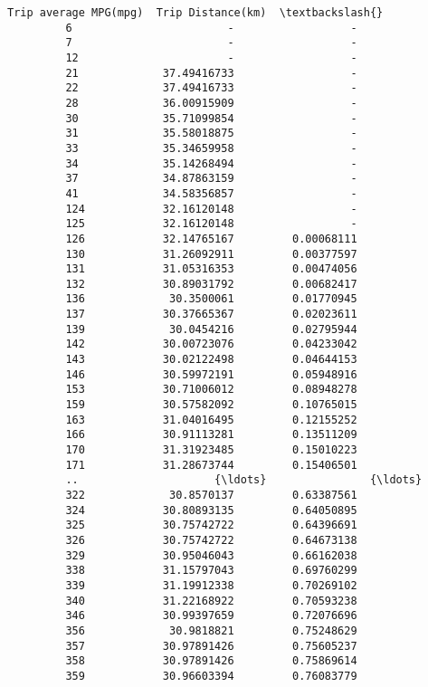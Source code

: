 \documentclass[11pt]{article}
\begin{document}
\begin{Verbatim}[commandchars=\\\{\}]
              Trip average MPG(mpg)  Trip Distance(km)  \textbackslash{}
         6                        -                  -   
         7                        -                  -   
         12                       -                  -   
         21             37.49416733                  -   
         22             37.49416733                  -   
         28             36.00915909                  -   
         30             35.71099854                  -   
         31             35.58018875                  -   
         33             35.34659958                  -   
         34             35.14268494                  -   
         37             34.87863159                  -   
         41             34.58356857                  -   
         124            32.16120148                  -   
         125            32.16120148                  -   
         126            32.14765167         0.00068111   
         130            31.26092911         0.00377597   
         131            31.05316353         0.00474056   
         132            30.89031792         0.00682417   
         136             30.3500061         0.01770945   
         137            30.37665367         0.02023611   
         139             30.0454216         0.02795944   
         142            30.00723076         0.04233042   
         143            30.02122498         0.04644153   
         146            30.59972191         0.05948916   
         153            30.71006012         0.08948278   
         159            30.57582092         0.10765015   
         163            31.04016495         0.12155252   
         166            30.91113281         0.13511209   
         170            31.31923485         0.15010223   
         171            31.28673744         0.15406501   
         ..                     {\ldots}                {\ldots}   
         322             30.8570137         0.63387561   
         324            30.80893135         0.64050895   
         325            30.75742722         0.64396691   
         326            30.75742722         0.64673138   
         329            30.95046043         0.66162038   
         338            31.15797043         0.69760299   
         339            31.19912338         0.70269102   
         340            31.22168922         0.70593238   
         346            30.99397659         0.72076696   
         356             30.9818821         0.75248629   
         357            30.97891426         0.75605237   
         358            30.97891426         0.75869614   
         359            30.96603394         0.76083779   

\end{Verbatim}
\end{document}
